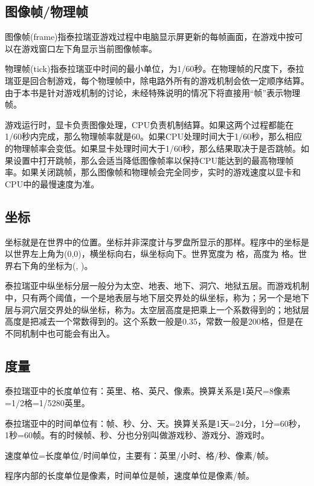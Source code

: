 \subsection{图像帧/物理帧}

图像帧(frame)指泰拉瑞亚游戏过程中电脑显示屏更新的每帧画面，在游戏中按可以在游戏窗口左下角显示当前图像帧率。

物理帧(tick)指泰拉瑞亚中时间的最小单位，为1/60秒。在物理帧的尺度下，泰拉瑞亚是回合制游戏，每个物理帧中，除电路外所有的游戏机制会依一定顺序结算。由于本书是针对游戏机制的讨论，未经特殊说明的情况下将直接用“帧”表示物理帧。

游戏运行时，显卡负责图像处理，CPU负责机制结算。如果这两个过程都能在1/60秒内完成，那么物理帧率就是60。如果CPU处理时间大于1/60秒，那么相应的物理帧率会变低。如果显卡处理时间大于1/60秒，那么结果取决于是否跳帧。如果设置中打开跳帧，那么会适当降低图像帧率以保持CPU能达到的最高物理帧率。如果关闭跳帧，那么图像帧和物理帧会完全同步，实时的游戏速度以显卡和CPU中的最慢速度为准。

\subsection{坐标}\label{tab8}
坐标就是在世界中的位置。坐标并非深度计与罗盘所显示的那样。程序中的坐标是以世界左上角为(0,0)，横坐标向右，纵坐标向下。世界宽度为  格，高度为  格。世界右下角的坐标为(, )。

泰拉瑞亚中纵坐标分层一般分为太空、地表、地下、洞穴、地狱五层。而游戏机制中，只有两个阈值，一个是地表层与地下层交界处的纵坐标，称为；另一个是地下层与洞穴层交界处的纵坐标，称为。太空层高度是把乘上一个系数得到的；地狱层高度是把减去一个常数得到的。这个系数一般是0.35，常数一般是200格，但是在不同机制中也可能会有出入。

\subsection{度量}
泰拉瑞亚中的长度单位有：英里、格、英尺、像素。换算关系是1英尺=8像素=1/2格=1/5280英里。

泰拉瑞亚中的时间单位有：帧、秒、分、天。换算关系是1天=24分，1分=60秒，1秒=60帧。有的时候帧、秒、分也分别叫做游戏秒、游戏分、游戏时。

速度单位=长度单位/时间单位，主要有：英里/小时、格/秒、像素/帧。

程序内部的长度单位是像素，时间单位是帧，速度单位是像素/帧。

